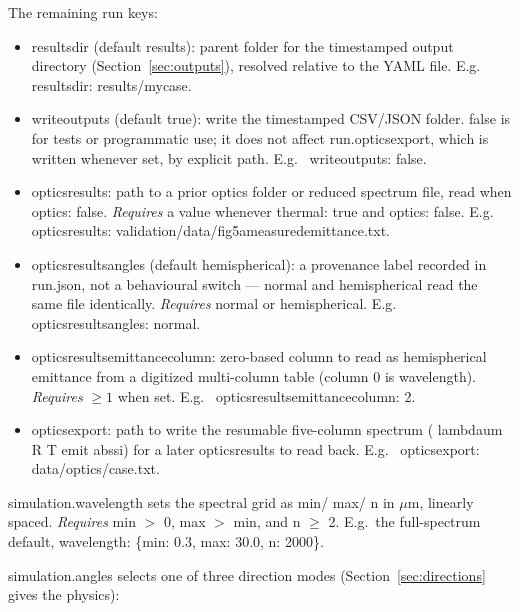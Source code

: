 \documentclass[11pt,a4paper,twoside]{article}
\DeclareRobustCommand{\code}[1]{\begingroup\upshape\ttfamily
  \def\_{\allowbreak\textunderscore\allowbreak}#1\endgroup}
\begin{document}
The remaining \code{run} keys:

\begin{itemize}
  \item \code{results\_dir} (default \code{results}): parent folder for the
        timestamped output directory (Section~\ref{sec:outputs}), resolved
        relative to the YAML file. E.g.\
        \code{results\_dir: results/my\_case}.
  \item \code{write\_outputs} (default \code{true}): write the timestamped
        CSV/JSON folder. \code{false} is for tests or programmatic use; it
        does not affect \code{run.optics\_export}, which is written whenever
        set, by explicit path. E.g.\ \code{write\_outputs: false}.
  \item \code{optics\_results}: path to a prior optics folder or reduced
        spectrum file, read when \code{optics: false}. \textit{Requires} a
        value whenever \code{thermal: true} and \code{optics: false}. E.g.\
        \code{optics\_results: validation/data/fig5a\_measured\_emittance.txt}.
  \item \code{optics\_results\_angles} (default \code{hemispherical}): a
        provenance label recorded in \code{run.json}, not a behavioural
        switch --- \code{normal} and \code{hemispherical} read the same file
        identically. \textit{Requires} \code{normal} or
        \code{hemispherical}. E.g.\ \code{optics\_results\_angles: normal}.
  \item \code{optics\_results\_emittance\_column}: zero-based column to read
        as hemispherical emittance from a digitized multi-column table (column
        \(0\) is wavelength). \textit{Requires} \(\geq 1\) when set. E.g.\
        \code{optics\_results\_emittance\_column: 2}.
  \item \code{optics\_export}: path to write the resumable five-column
        spectrum (\code{lambda\_um R T emit abs\_si}) for a later
        \code{optics\_results} to read back. E.g.\
        \code{optics\_export: data/optics/case.txt}.
\end{itemize}

\code{simulation.wavelength} sets the spectral grid as \code{min}/\code{max}/
\code{n} in \(\mu\)m, linearly spaced. \textit{Requires} \code{min} \(>\)
\(0\), \code{max} \(>\) \code{min}, and \code{n} \(\geq\) \code{2}. E.g.\ the
full-spectrum default, \code{wavelength: \{min: 0.3, max: 30.0, n: 2000\}}.

\code{simulation.angles} selects one of three direction modes
(Section~\ref{sec:directions} gives the physics):
\end{document}
